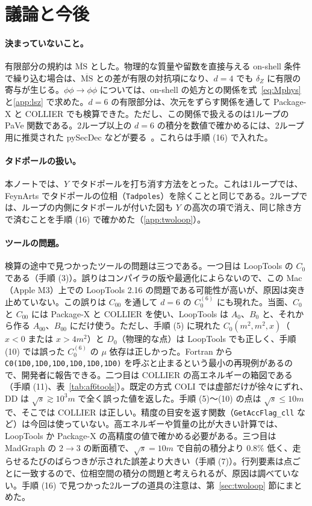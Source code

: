 \documentclass[a4paper,10pt]{ltjsarticle}
\begin{document}
\section{議論と今後}\label{sec:discussion}

\paragraph{決まっていないこと。}有限部分の規約は $\overline{\mathrm{MS}}$ とした。物理的な質量や留数を直接与える on-shell 条件で繰り込む場合は、$\overline{\mathrm{MS}}$ との差が有限の対抗項になり、$d=4$ でも $\delta_Z$ に有限の寄与が生じる。$\phi\phi\to\phi\phi$ については、on-shell の処方との関係を式~\eqref{eq:Mphys} と\ref{app:lsz} で求めた。$d=6$ の有限部分は、次元をずらす関係を通して Package-X と COLLIER でも検算できた。ただし、この関係で扱えるのは1ループの PaVe 関数である。2ループ以上の $d=6$ の積分を数値で確かめるには、2ループ用に推奨された pySecDec などが要る~\cite{review}。これらは手順 (16) で入れた。

\paragraph{タドポールの扱い。}本ノートでは、$Y$ でタドポールを打ち消す方法をとった。これは1ループでは、FeynArts でタドポールの位相（\texttt{Tadpoles}）を除くことと同じである。2ループでは、ループの内側にタドポールが付いた図も $Y$ の高次の項で消え、同じ除き方で済むことを手順 (16) で確かめた（\ref{app:twoloop}）。

\paragraph{ツールの問題。}検算の途中で見つかったツールの問題は三つである。一つ目は LoopTools の $C_0$ である（手順 (3)）。誤りはコンパイラの版や最適化によらないので、この Mac（Apple M3）上での LoopTools 2.16 の問題である可能性が高いが、原因は突き止めていない。この誤りは $C_{00}$ を通して $d=6$ の $C_0^{(6)}$ にも現れた。当面、$C_0$ と $C_{00}$ には Package-X と COLLIER を使い、LoopTools は $A_0$、$B_0$ と、それから作る $A_{00}$、$B_{00}$ にだけ使う。ただし、手順 (5) に現れた $C_0(m^2,m^2,x)$（$x<0$ または $x>4m^2$）と $D_0$（物理的な点）は LoopTools でも正しく、手順 (10) では誤った $C_0^{(6)}$ の $\mu$ 依存は正しかった。Fortran から \texttt{C0(1D0,1D0,1D0,1D0,1D0,1D0)} を呼ぶと止まるという最小の再現例があるので、開発者に報告できる。二つ目は COLLIER の高エネルギーの箱図である（手順 (11)、表~\ref{tab:af6tools}）。既定の方式 COLI では虚部だけが徐々にずれ、DD は $\sqrt s\gtrsim10^3m$ で全く誤った値を返した。手順 (5)〜(10) の点は $\sqrt s\le10m$ で、そこでは COLLIER は正しい。精度の目安を返す関数（\texttt{GetAccFlag\_cll} など）は今回は使っていない。高エネルギーや質量の比が大きい計算では、LoopTools か Package-X の高精度の値で確かめる必要がある。三つ目は MadGraph の $2\to3$ の断面積で、$\sqrt s=10m$ で自前の積分より $0.8\%$ 低く、走らせるたびのばらつきが示された誤差より大きい（手順 (7)）。行列要素は点ごとに一致するので、位相空間の積分の問題と考えられるが、原因は調べていない。手順 (16) で見つかった2ループの道具の注意は、第~\ref{sec:twoloop} 節にまとめた。
\end{document}
